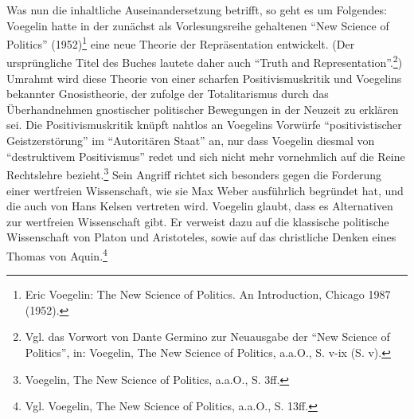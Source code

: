 \documentclass[12pt,a4paper,ngerman]{article}
\begin{document}
Was nun die inhaltliche Auseinandersetzung betrifft, so geht es um Folgendes:
Voegelin hatte in der zunächst als Vorlesungsreihe gehaltenen "`New Science of
Politics"' (1952)\footnote{Eric Voegelin: The New Science of Politics. An
  Introduction, Chicago 1987 (1952).} eine neue Theorie der Repräsentation
entwickelt. (Der ursprüngliche Titel des Buches lautete daher auch "`Truth and
Representation"'.\footnote{Vgl. das Vorwort von Dante Germino zur Neuausgabe
  der ``New Science of Politics'', in: Voegelin, The New Science of Politics,
  a.a.O., S. v-ix (S. v).}) Umrahmt wird diese Theorie von einer scharfen
Positivismuskritik und Voegelins bekannter Gnosistheorie, der zufolge der
Totalitarismus durch das Überhandnehmen gnostischer politischer Bewegungen in
der Neuzeit zu erklären sei. Die Positivismuskritik knüpft nahtlos an
Voegelins Vorwürfe "`positivistischer Geistzerstörung"' im "`Autoritären
Staat"' an, nur dass Voegelin diesmal von "`destruktivem Positivismus"' redet
und sich nicht mehr vornehmlich auf die Reine Rechtslehre
bezieht.\footnote{Voegelin, The New Science of Politics, a.a.O., S. 3ff.} Sein
Angriff richtet sich besonders gegen die Forderung einer wertfreien
Wissenschaft, wie sie Max Weber ausführlich begründet hat, und die auch von
Hans Kelsen vertreten wird.  Voegelin glaubt, dass es Alternativen zur
wertfreien Wissenschaft gibt. Er verweist dazu auf die klassische politische
Wissenschaft von Platon und Aristoteles, sowie auf das christliche Denken
eines Thomas von Aquin.\footnote{Vgl. Voegelin, The New Science of Politics,
  a.a.O., S. 13ff.}
\end{document}
